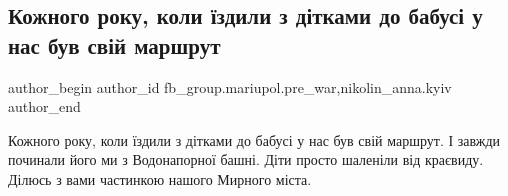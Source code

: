  
 
 
 
 

\subsection{Кожного року, коли їздили з дітками до бабусі у нас був свій маршрут}
\label{sec:15_01_2023.fb.fb_group.mariupol.pre_war.3.kozhnogo_roku__koli_}
 
\ifcmt
 author_begin
   author_id fb_group.mariupol.pre_war,nikolin_anna.kyiv
 author_end
\fi

Кожного року, коли їздили з дітками до бабусі у нас був свій маршрут. І завжди
починали його ми з Водонапорної башні. Діти просто шаленіли від краєвиду.
Ділюсь з вами частинкою нашого Мирного міста.
